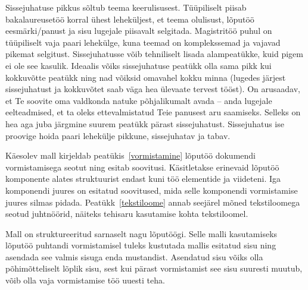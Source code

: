Sissejuhatuse pikkus sõltub teema keerulisusest. Tüüpiliselt piisab bakalaureusetöö korral ühest leheküljest, et teema olulisust, lõputöö eesmärki/panust ja sisu lugejale piisavalt selgitada. Magistritöö puhul on tüüpiliselt vaja paari lehekülge, kuna teemad on komplekssemad ja vajavad pikemat selgitust. Sissejuhatusse võib tehniliselt lisada alampeatükke, kuid pigem ei ole see kasulik. Ideaalis võiks sissejuhatuse peatükk olla sama pikk kui kokkuvõtte peatükk ning nad võiksid omavahel kokku minna (lugedes järjest sissejuhatust ja kokkuvõtet saab väga hea ülevaate tervest tööst). On arusaadav, et Te soovite oma valdkonda natuke põhjalikumalt avada – anda lugejale eelteadmised, et ta oleks ettevalmistatud Teie panusest aru saamiseks. Selleks on hea aga juba järgmine suurem peatükk pärast sissejuhatust. Sissejuhatus ise proovige hoida paari lehekülje pikkune, sissejuhatav ja tabav.

Käesolev mall kirjeldab peatükis~\ref{vormistamine} lõputöö dokumendi vormistamisega seotut ning esitab soovitusi. Käsitletakse erinevaid lõputöö komponente alates struktuurist endast kuni töö elementide ja viideteni. Iga komponendi juures on esitatud soovitused, mida selle komponendi vormistamise juures silmas pidada. Peatükk~\ref{tekstiloome} annab seejärel mõned tekstiloomega seotud juhtnöörid, näiteks tehisaru kasutamise kohta tekstiloomel.

Mall on struktureeritud sarnaselt nagu lõputöögi. Selle malli kasutamiseks lõputöö puhtandi vormistamisel tuleks kustutada mallis esitatud sisu ning asendada see valmis sisuga enda mustandist. Asendatud sisu võiks olla põhimõtteliselt lõplik sisu, sest kui pärast vormistamist see sisu suuresti muutub, võib olla vaja vormistamise töö uuesti teha.